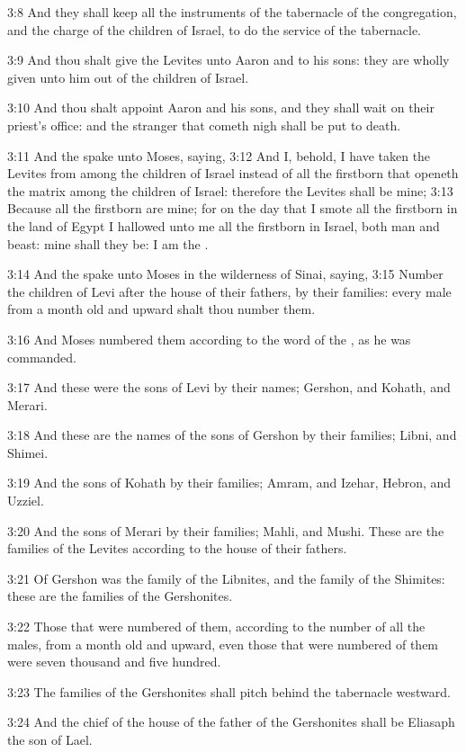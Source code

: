 3:8 And they shall keep all the instruments of the tabernacle of the congregation, and the charge of the children of Israel, to do the service of the tabernacle.

3:9 And thou shalt give the Levites unto Aaron and to his sons: they are wholly given unto him out of the children of Israel.

3:10 And thou shalt appoint Aaron and his sons, and they shall wait on their priest's office: and the stranger that cometh nigh shall be put to death.

3:11 And the \LORD spake unto Moses, saying, 3:12 And I, behold, I have taken the Levites from among the children of Israel instead of all the firstborn that openeth the matrix among the children of Israel: therefore the Levites shall be mine; 3:13 Because all the firstborn are mine; for on the day that I smote all the firstborn in the land of Egypt I hallowed unto me all the firstborn in Israel, both man and beast: mine shall they be: I am the \LORD.

3:14 And the \LORD spake unto Moses in the wilderness of Sinai, saying, 3:15 Number the children of Levi after the house of their fathers, by their families: every male from a month old and upward shalt thou number them.

3:16 And Moses numbered them according to the word of the \LORD, as he was commanded.

3:17 And these were the sons of Levi by their names; Gershon, and Kohath, and Merari.

3:18 And these are the names of the sons of Gershon by their families; Libni, and Shimei.

3:19 And the sons of Kohath by their families; Amram, and Izehar, Hebron, and Uzziel.

3:20 And the sons of Merari by their families; Mahli, and Mushi. These are the families of the Levites according to the house of their fathers.

3:21 Of Gershon was the family of the Libnites, and the family of the Shimites: these are the families of the Gershonites.

3:22 Those that were numbered of them, according to the number of all the males, from a month old and upward, even those that were numbered of them were seven thousand and five hundred.

3:23 The families of the Gershonites shall pitch behind the tabernacle westward.

3:24 And the chief of the house of the father of the Gershonites shall be Eliasaph the son of Lael.

